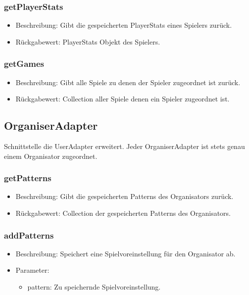 \documentclass[a4paper]{scrreprt}
\begin{document}
    \subsubsection{getPlayerStats}
    \begin{itemize}
        \item Beschreibung: Gibt die gespeicherten PlayerStats eines Spielers zurück.
        \item Rückgabewert: PlayerStats Objekt des Spielers.
    \end{itemize}

    \subsubsection{getGames}
    \begin{itemize}
        \item Beschreibung: Gibt alle Spiele zu denen der Spieler zugeordnet ist zurück.
        \item Rückgabewert: Collection aller Spiele denen ein Spieler zugeordnet ist.
    \end{itemize}

    \subsection{OrganiserAdapter}
    Schnittstelle die UserAdapter erweitert.
    Jeder OrganiserAdapter ist stets genau einem Organisator zugeordnet.

    \subsubsection{getPatterns}
    \begin{itemize}
        \item Beschreibung: Gibt die gespeicherten Patterns des Organisators zurück.
        \item Rückgabewert: Collection der gespeicherten Patterns des Organisators.
    \end{itemize}

    \subsubsection{addPatterns}
    \begin{itemize}
        \item Beschreibung: Speichert eine Spielvoreinstellung für den Organisator ab.
        \item Parameter:
        \begin{itemize}
            \item pattern: Zu speichernde Spielvoreinstellung.
        \end{itemize}
    \end{itemize}
\end{document}

